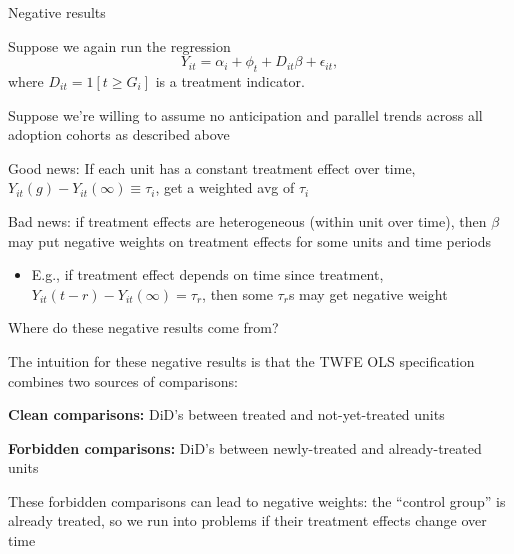 \documentclass[aspectratio = 169, 13pt]{beamer}
\begin{document}
\begin{frame}{Negative results}
	\begin{wideitemize}
		\item
		Suppose we again run the regression
		\vspace{-3mm}
		$$Y_{it} = \alpha_i + \phi_t + D_{it} \beta  + \epsilon_{it}, $$
		\noindent where $D_{it} = 1[t \geq G_i]$ is a treatment indicator. 
		
		\item
		Suppose we're willing to assume no anticipation and  parallel trends across all adoption cohorts as described above
		
		\pause
		\vspace{-3mm}
		\item
		Good news: If each unit has a constant treatment effect over time, $Y_{it}(g) - Y_{it}(\infty) \equiv \tau_i$, get a weighted avg of $\tau_i$
		
		\pause
		\vspace{-3mm}
		\item
		Bad news: if treatment effects are heterogeneous (within unit over time), then $\beta$ may put negative weights on treatment effects for some units and time periods
		\begin{itemize}
			\item
			E.g., if treatment effect depends on time since treatment, $Y_{it}(t-r) - Y_{it}(\infty) = \tau_{r}$, then some $\tau_r$s may get negative weight
		\end{itemize}
	\end{wideitemize}
\end{frame}

\begin{frame}{Where do these negative results come from?}
	\begin{wideitemize}
		\item
		The intuition for these negative results is that the TWFE OLS specification combines two sources of comparisons:
		
		\medskip
		
		\begin{enumerate}
			{\normalsize
				\item
				\textbf{Clean comparisons:} DiD's between treated and not-yet-treated units
				
				\medskip
				
				\item
				\textbf{Forbidden comparisons:} DiD's between newly-treated and already-treated units
			}
		\end{enumerate}
		
		\item
		These forbidden comparisons can lead to negative weights: the ``control group'' is already treated, so we run into problems if their treatment effects change over time
	\end{wideitemize}
\end{frame}
\end{document}
